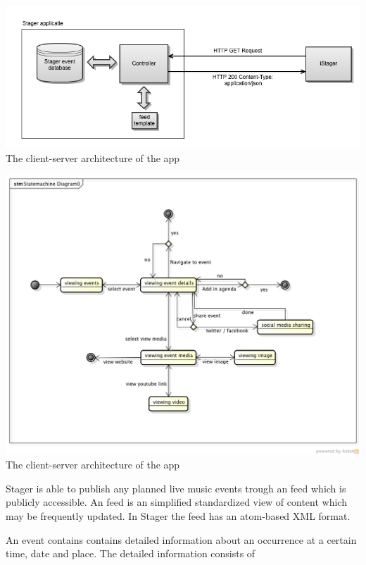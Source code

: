 
\begin{centering}
	\includegraphics[scale=0.4]{images/globale_architectuur.png}\\{The client-server architecture of the app}\\
\end{centering}
\begin{centering}
	\includegraphics[scale=0.4]{images/stagerapp_statediagram.png}\\{The client-server architecture of the app}\\
\end{centering}


Stager is able to publish any planned live music events trough an feed which is publicly accessible. An feed is an simplified standardized view of content which may be frequently updated. In Stager the feed has an atom-based XML format.

An event contains contains detailed information about an occurrence at a certain time, date and place. The detailed information consists of 

